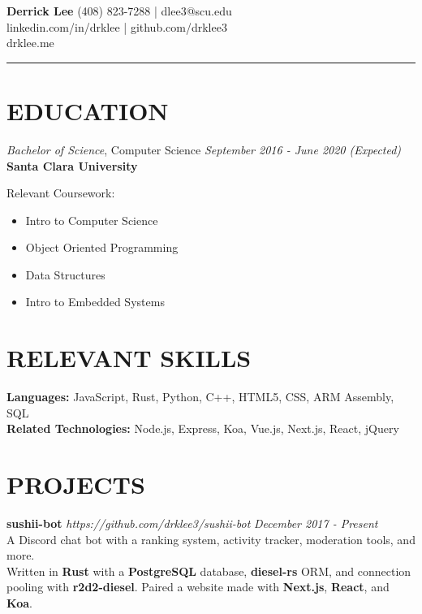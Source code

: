 \documentclass{res}
\begin{document}
	\thispagestyle{empty} %
	{\bf \LARGE{Derrick Lee}} \hfill {(408) 823-7288 | dlee3@scu.edu} \\
	\hspace*{\fill} {linkedin.com/in/drklee | github.com/drklee3} \\
	\hspace*{\fill} {drklee.me}
	\noindent\rule{\textwidth}{1pt}
	\begin{resume}

		\section{EDUCATION}

		{\sl Bachelor of Science}, Computer Science \hfill \emph{September 2016 - June 2020 (Expected)} \\
			{\bf Santa Clara University}

			Relevant Coursework:
			\begin{multicols}{2}
			\begin{itemize} \itemsep -2pt
				\item Intro to Computer Science
				\item Object Oriented Programming
				\item Data Structures
				\item Intro to Embedded Systems
			\end{itemize}
			\end{multicols}
		
		\section{RELEVANT SKILLS}
		\vspace{6pt}

			{\bf Languages:} JavaScript, Rust, Python, C++, HTML5, CSS, ARM Assembly, SQL \\
			{\bf Related Technologies:} Node.js, Express, Koa, Vue.js, Next.js, React, jQuery

		\section{PROJECTS} 
		\vspace{6pt}

		{\bf sushii-bot} \emph{https://github.com/drklee3/sushii-bot} \hfill \emph{December 2017 - Present} \\
			A Discord chat bot with a ranking system, activity tracker, moderation tools, and more. \\
			Written in {\bf Rust} with a {\bf PostgreSQL} database, {\bf diesel-rs} ORM, and connection pooling with {\bf r2d2-diesel}.
			Paired a website made with {\bf Next.js}, {\bf React}, and {\bf Koa}.


\end{resume}
\end{document}
